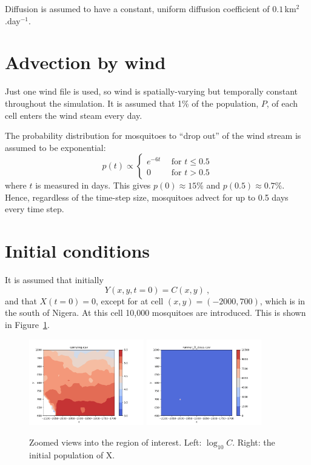 \documentclass{article}
\begin{document}
Diffusion is assumed to have a constant, uniform diffusion coefficient of $0.1$\,km$^{2}$.day$^{-1}$.

\section{Advection by wind}

Just one wind file is used, so wind is spatially-varying but temporally constant throughout the simulation.  It is assumed that 1\% of the population, $P$, of each cell enters the wind steam every day.

The probability distribution for mosquitoes to ``drop out'' of the wind stream is assumed to be exponential:
\begin{equation}
  p(t) \propto \left\{
  \begin{array}{ll}
    e^{-6t} & \ \ \mbox{for } t \leq 0.5 \\
    0 & \ \ \mbox{for } t > 0.5
  \end{array}
  \right.
\end{equation}
where $t$ is measured in days.  This gives $p(0)\approx 15$\% and $p(0.5) \approx 0.7$\%.  Hence, regardless of the time-step size, mosquitoes advect for up to 0.5 days every time step.

\section{Initial conditions}

It is assumed that initially
\begin{equation}
  Y(x, y, t=0) = C(x, y) \ ,
\end{equation}
and that $X(t=0)=0$, except for at cell $(x, y) = (-2000, 700)$, which is in the south of Nigera.  At this cell 10,000 mosquitoes are introduced.  This is shown in Figure~\ref{zoom_0.fig}.

\begin{figure}[htb]
  \centering
  \includegraphics[width=5cm]{carrying_zoom.png} \quad
  \includegraphics[width=5cm]{runner_0_days.png}
  \caption{\label{zoom_0.fig}Zoomed views into the region of interest.  Left: $\log_{10}C$.  Right: the initial population of X.}
\end{figure}
\end{document}
